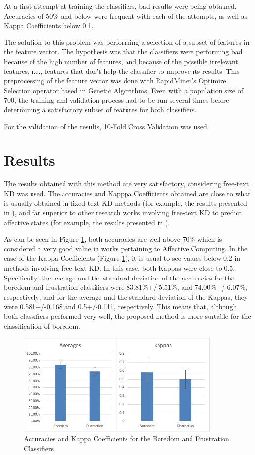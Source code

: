 \documentclass[runningheads,a4paper]{llncs}
\begin{document}
At a first attempt at training the classifiers, bad results were being obtained. Accuracies of 50\% and below were frequent with each of the attempts, as well as Kappa Coefficients below 0.1.

The solution to this problem was performing a selection of a subset of features in the feature vector. The hypothesis was that the classifiers were performing bad because of the high number of features, and because of the possible irrelevant features, i.e., features that don't help the classifier to improve its results. This preprocessing of the feature vector was done with RapidMiner's Optimize Selection operator based in Genetic Algorithms. Even with a population size of 700, the training and validation process had to be run several times before determining a satisfactory subset of features for both classifiers.

For the validation of the results, 10-Fold Cross Validation was used.

\section{Results}

The results obtained with this method are very satisfactory, considering free-text KD was used. The accuracies and Kapppa Coefficients obtained are close to what is usually obtained in fixed-text KD methods (for example, the results presented in \cite{keystroke-dynamics1}), and far superior to other research works involving free-text KD to predict affective states (for example, the results presented in \cite{keystroke-dynamics2}).

As can be seen in Figure \ref{accuracies-kappas}, both accuracies are well above 70\% which is considered a very good value in works pertaining to Affective Computing. In the case of the Kappa Coefficients (Figure \ref{accuracies-kappas}), it is usual to see values below 0.2 in methods involving free-text KD. In this case, both Kappas were close to 0.5. Specifically, the average and the standard deviation of the accuracies for the boredom and frustration classifiers were 83.81\%+/-5.51\%, and 74.00\%+/-6.07\%, respectively; and for the average and the standard deviation of the Kappas, they were 0.581+/-0.168 and 0.5+/-0.111, respectively. This means that, although both classifiers performed very well, the proposed method is more suitable for the classification of boredom.

\begin{figure}[htp]
  \centerline{\includegraphics[width=10cm]{accuracy-kappa.png}}
  \label{accuracies-kappas}
  \caption{Accuracies and Kappa Coefficients for the Boredom and Frustration Classifiers}
\end{figure}
\end{document}
